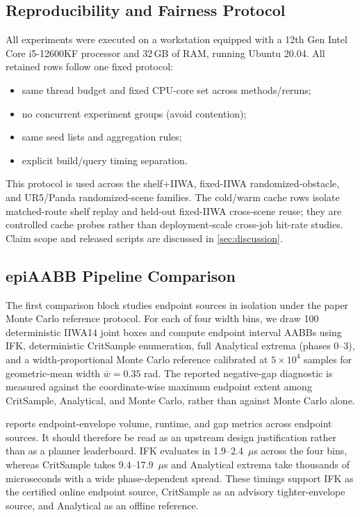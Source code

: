 \documentclass[journal]{IEEEtran}
\begin{document}
\subsection{Reproducibility and Fairness Protocol}
\label{sec:exp_repro}

All experiments were executed on a workstation equipped with a 12th Gen Intel Core i5-12600KF processor and 32\,GB of RAM, running Ubuntu 20.04.
All retained rows follow one fixed protocol:
\begin{itemize}[nosep]
  \item same thread budget and fixed CPU-core set across methods/reruns;
  \item no concurrent experiment groups (avoid contention);
  \item same seed lists and aggregation rules;
  \item explicit build/query timing separation.
\end{itemize}
This protocol is used across the shelf+IIWA, fixed-IIWA randomized-obstacle, and
UR5/Panda randomized-scene families. The cold/warm cache rows isolate
matched-route shelf replay and held-out fixed-IIWA cross-scene reuse; they are
controlled cache probes rather than deployment-scale cross-job hit-rate studies.
Claim scope and released scripts are discussed in \cref{sec:discussion}.


\subsection{epiAABB Pipeline Comparison}\label{sec:exp_epiaabb}

The first comparison block studies endpoint sources in isolation under the
paper Monte Carlo reference protocol. For each of four width bins,
we draw 100 deterministic IIWA14 joint boxes and compute endpoint interval
AABBs using IFK, deterministic CritSample enumeration, full Analytical
extrema (phases 0--3), and a width-proportional Monte Carlo reference
calibrated at $5\times 10^4$ samples for geometric-mean width
$\bar{w}=0.35$ rad. The reported negative-gap diagnostic is measured against
the coordinate-wise maximum endpoint extent among CritSample, Analytical, and
Monte Carlo, rather than against Monte Carlo alone.

 reports endpoint-envelope
volume, runtime, and gap metrics across endpoint sources. It should therefore
be read as an upstream design justification rather than as a planner
leaderboard. IFK evaluates in 1.9--2.4~$\mu$s across the four bins, whereas
CritSample takes 9.4--17.9~$\mu$s and Analytical extrema take thousands of
microseconds with a wide phase-dependent spread. These timings support IFK as the certified online endpoint
source, CritSample as an advisory tighter-envelope source, and Analytical as an
offline reference.
\end{document}
